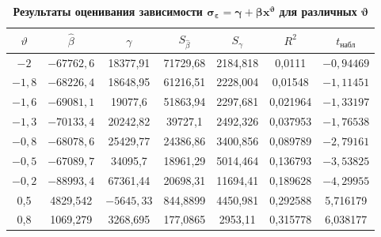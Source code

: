 \begin{table}[h!]\small\centering



\begin{minipage}{.9\textwidth}



\caption{\bf Результаты оценивания зависимости $\boldsymbol{\sigma_\varepsilon=\gamma+\beta x^\vartheta}$ для различных $\boldsymbol \vartheta$ \label{repina:tabl2}} \vspace{-3mm}

\begin{tabular}{c|c|c|c|c|c|c} \hline

\footnotesize $\vartheta$ & 

\footnotesize $\hat{\beta}$ &

\footnotesize $\gamma$ &

\footnotesize $S_{\hat{\beta}}$ &

\footnotesize $S_\gamma$ & $R^2$ &

\footnotesize $t_{\text{набл}}$  \\ \hline

\rule{0mm}{12pt}%

$-2$ & $-67762,6$ & 18377,91 & 71729,68 & 2184,818& 0,0111& $-0,94469$ \\ 

$-1,8$ & $-68226,4$ & 18648,95 & 61216,51 & 2228,004& 0,01548& $-1,11451$ \\ 

$-1,6$ & $-69081,1$ & 19077,6 & 51863,94 & 2297,681 & 0,021964 & $-1,33197$ \\ 

$-1,3$ & $-70133,4$ & 20242,82& 39727,1 & 2492,326 & 0,037953 & $-1,76538$ \\ 

$-0,8$ & $-68078,6$ & 25429,77& 24386,86& 3400,856 & 0,089789 & $-2,79161$ \\ 

$-0,5$ & $-67089,7$ & 34095,7 & 18961,29& 5014,464 & 0,136793 & $-3,53825$ \\ 

$-0,2$ & $-88993,4$ & 67361,44& 20698,31& 11694,41 & 0,189628 & $-4,29955$ \\ 

0,5 & 4829,542 & $-5645,33$ & 844,8899 & 4450,981 & 0,292588 & 5,716179 \\ 

0,8 & 1069,279 & 3268,695 & 177,0865 & 2953,11 & 0,315778 & 6,038177 \\ 


\end{tabular}
\end{minipage}
\end{table}
